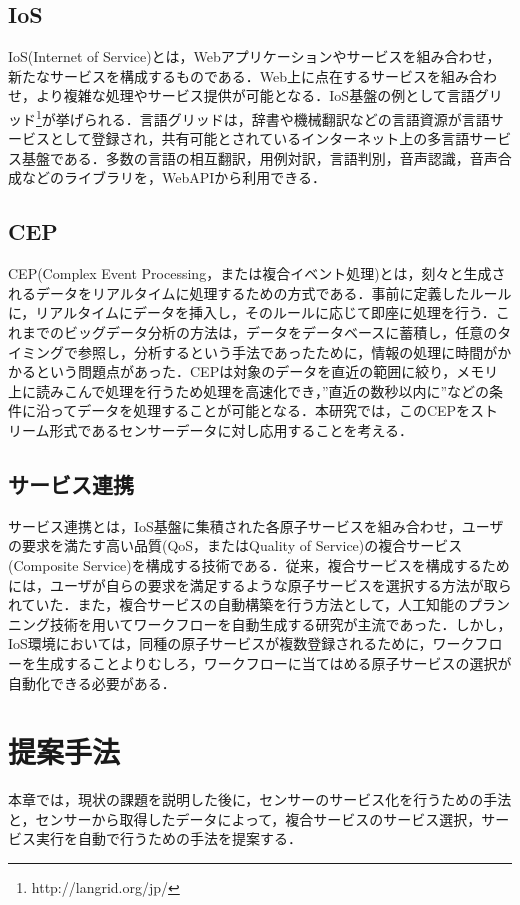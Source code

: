 \documentclass{kuisthesis}			%
\begin{document}
\subsection{IoS}\label{subsec-abstract}
IoS(Internet of Service)とは，Webアプリケーションやサービスを組み合わせ，新たなサービスを構成するものである．Web上に点在するサービスを組み合わせ，より複雑な処理やサービス提供が可能となる．IoS基盤の例として言語グリッド\footnote{http://langrid.org/jp/}が挙げられる．言語グリッドは，辞書や機械翻訳などの言語資源が言語サービスとして登録され，共有可能とされているインターネット上の多言語サービス基盤である．多数の言語の相互翻訳，用例対訳，言語判別，音声認識，音声合成などのライブラリを，WebAPIから利用できる．

\subsection{CEP}
CEP(Complex Event Processing，または複合イベント処理)とは，刻々と生成されるデータをリアルタイムに処理するための方式である．事前に定義したルールに，リアルタイムにデータを挿入し，そのルールに応じて即座に処理を行う．これまでのビッグデータ分析の方法は，データをデータベースに蓄積し，任意のタイミングで参照し，分析するという手法であったために，情報の処理に時間がかかるという問題点があった．CEPは対象のデータを直近の範囲に絞り，メモリ上に読みこんで処理を行うため処理を高速化でき，”直近の数秒以内に”などの条件に沿ってデータを処理することが可能となる．本研究では，このCEPをストリーム形式であるセンサーデータに対し応用することを考える．

\subsection{サービス連携}
サービス連携とは，IoS基盤に集積された各原子サービスを組み合わせ，ユーザの要求を満たす高い品質(QoS，またはQuality of Service)の複合サービス(Composite Service)を構成する技術である．従来，複合サービスを構成するためには，ユーザが自らの要求を満足するような原子サービスを選択する方法が取られていた．また，複合サービスの自動構築を行う方法として，人工知能のプランニング技術を用いてワークフローを自動生成する研究が主流であった．しかし，IoS環境においては，同種の原子サービスが複数登録されるために，ワークフローを生成することよりむしろ，ワークフローに当てはめる原子サービスの選択が自動化できる必要がある．

\section{提案手法}
本章では，現状の課題を説明した後に，センサーのサービス化を行うための手法と，センサーから取得したデータによって，複合サービスのサービス選択，サービス実行を自動で行うための手法を提案する．
\end{document}
